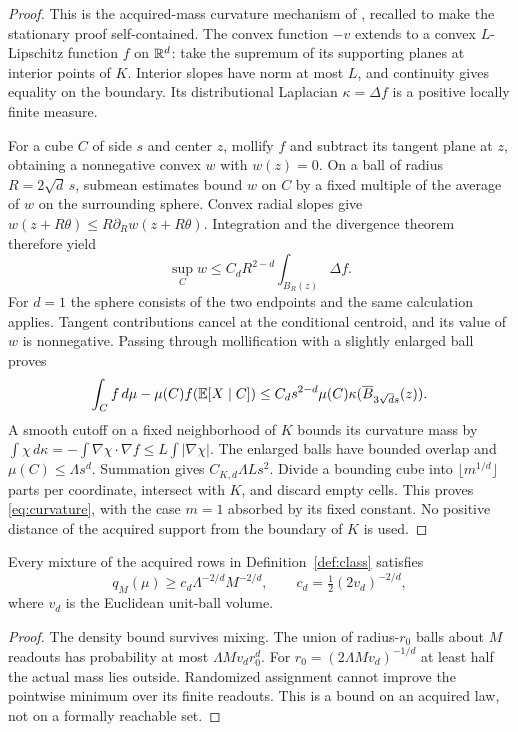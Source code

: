 \begin{proof}
This is the acquired-mass curvature mechanism of \cite{GTFControlled}, recalled to make the stationary proof self-contained. The convex function $-v$ extends to a convex $L$-Lipschitz function $f$ on $\mathbb R^d$: take the supremum of its supporting planes at interior points of $K$. Interior slopes have norm at most $L$, and continuity gives equality on the boundary. Its distributional Laplacian $\kappa=\Delta f$ is a positive locally finite measure.

For a cube $C$ of side $s$ and center $z$, mollify $f$ and subtract its tangent plane at $z$, obtaining a nonnegative convex $w$ with $w(z)=0$. On a ball of radius $R=2\sqrt d\,s$, submean estimates bound $w$ on $C$ by a fixed multiple of the average of $w$ on the surrounding sphere. Convex radial slopes give $w(z+R\theta)\le R\partial_Rw(z+R\theta)$. Integration and the divergence theorem therefore yield
\[
 \sup_Cw\le C_dR^{2-d}\int_{B_R(z)}\Delta f.
\]
For $d=1$ the sphere consists of the two endpoints and the same calculation applies. Tangent contributions cancel at the conditional centroid, and its value of $w$ is nonnegative. Passing through mollification with a slightly enlarged ball proves
\[
 \int_C f\,d\mu-\mu(C)f(\mathbb E[X\mid C])
 \le C_ds^{2-d}\mu(C)\kappa(\overline B_{3\sqrt d s}(z)).
\]
A smooth cutoff on a fixed neighborhood of $K$ bounds its curvature mass by
$\int\chi\,d\kappa=-\int\nabla\chi\cdot\nabla f\le L\int|\nabla\chi|$.
The enlarged balls have bounded overlap and $\mu(C)\le\Lambda s^d$. Summation gives $C_{K,d}\Lambda Ls^2$. Divide a bounding cube into $\lfloor m^{1/d}\rfloor$ parts per coordinate, intersect with $K$, and discard empty cells. This proves \eqref{eq:curvature}, with the case $m=1$ absorbed by its fixed constant. No positive distance of the acquired support from the boundary of $K$ is used.
\end{proof}

\begin{lemma}\label{lem:smallball}
Every mixture of the acquired rows in Definition~\ref{def:class} satisfies
\begin{equation}\label{eq:smallball}
 q_M(\mu)\ge c_d\Lambda^{-2/d}M^{-2/d},\qquad
 c_d=\tfrac12(2v_d)^{-2/d},
\end{equation}
where $v_d$ is the Euclidean unit-ball volume.
\end{lemma}
\begin{proof}
The density bound survives mixing. The union of radius-$r_0$ balls about $M$ readouts has probability at most $\Lambda Mv_dr_0^d$. For $r_0=(2\Lambda Mv_d)^{-1/d}$ at least half the actual mass lies outside. Randomized assignment cannot improve the pointwise minimum over its finite readouts. This is a bound on an acquired law, not on a formally reachable set.
\end{proof}
